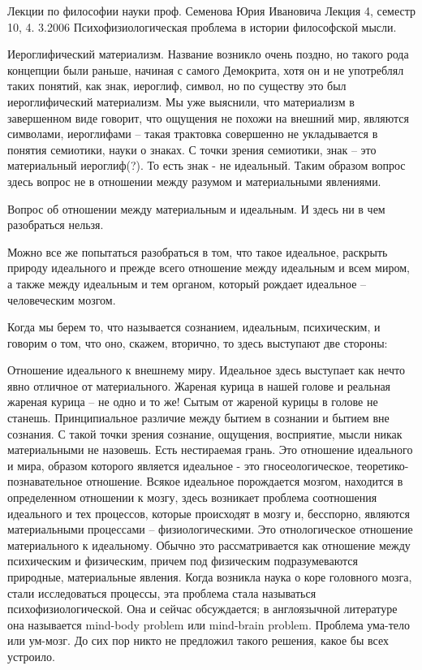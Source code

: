 
Лекции по философии науки проф. Семенова Юрия Ивановича
Лекция 4, семестр 10, 4. 3.2006
Психофизиологическая проблема в истории философской мысли.

Иероглифический материализм. Название возникло очень поздно, но такого рода концепции были раньше, начиная с самого Демокрита, хотя он и не употреблял таких понятий, как знак, иероглиф, символ, но по существу это был иероглифический материализм. Мы уже выяснили, что материализм в завершенном виде говорит, что ощущения не похожи на внешний мир, являются символами, иероглифами – такая трактовка совершенно не укладывается в понятия семиотики, науки о знаках. С точки зрения семиотики, знак – это материальный иероглиф(?). То есть знак - не идеальный. Таким образом вопрос здесь вопрос не в отношении между разумом и материальными явлениями.

Вопрос об отношении между материальным и идеальным. И здесь ни в чем разобраться нельзя.

    Можно все же попытаться разобраться в том, что такое идеальное, раскрыть природу идеального и прежде всего отношение между идеальным и всем миром, а также между идеальным и тем органом, который рождает идеальное – человеческим мозгом.

Когда мы берем то, что называется сознанием, идеальным, психическим, и говорим о том, что оно, скажем, вторично, то здесь выступают две стороны:

    Отношение идеального к внешнему миру. Идеальное здесь выступает как нечто явно отличное от материального. Жареная курица в нашей голове и реальная жареная курица – не одно и то же! Сытым от жареной курицы в голове не станешь. Принципиальное различие между бытием в сознании и бытием вне сознания. С такой точки зрения сознание, ощущения, восприятие, мысли никак материальными не назовешь. Есть нестираемая грань. Это отношение идеального и мира, образом которого является идеальное - это гносеологическое, теоретико-познавательное отношение.
    Всякое идеальное порождается мозгом, находится в определенном отношении к мозгу, здесь возникает проблема соотношения идеального и тех процессов, которые происходят в мозгу и, бесспорно, являются материальными процессами – физиологическими. Это отнологическое отношение материального к идеальному. Обычно это рассматривается как отношение между психическим и физическим, причем под физическим подразумеваются природные, материальные явления. Когда возникла наука о коре головного мозга, стали исследоваться процессы, эта проблема стала называться психофизиологической. Она и сейчас обсуждается; в англоязычной литературе она называется mind-body problem или mind-brain problem. Проблема ума-тело или ум-мозг. До сих пор никто не предложил такого решения, какое бы всех устроило.

